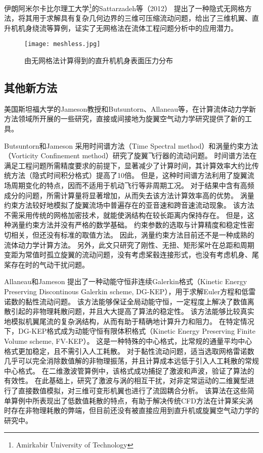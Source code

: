 \documentclass[doctor,openright,twoside,color]{buaathesis}
\begin{document}
伊朗阿米尔卡比尔理工大学\footnote{Amirkabir University of Technology}的Sattarzadeh等（2012）
提出了一种隐式无网格方法，将其用于求解具有复杂几何边界的三维可压缩流动问题，给出了三维机翼、直升机机身绕流等算例，证实了无网格法在流体工程问题分析中的应用潜力。
\begin{figure}[t!]
    \centering
    \texttt{[image: meshless.jpg]}
    \caption{由无网格法计算得到的直升机机身表面压力分布}
\end{figure}

\subsection{其他新方法}

美国斯坦福大学的Jameson教授和Butsuntorn、Allaneau等，在计算流体动力学新方法领域所开展的一些研究，直接或间接地为旋翼空气动力学研究提供了新的工具。

Butsuntorn和Jameson
采用时间谱方法（Time Spectral method）和涡量约束方法（Vorticity Confinement method）研究了旋翼飞行器的流动问题。
时间谱方法在满足工程问题所需精度要求的前提下，显著减少了计算时间，其计算效率大约比传统方法（隐式时间积分格式）提高了10倍。
但是，这种时间谱方法利用了旋翼流场周期变化的特点，因而不适用于机动飞行等非周期工况。
对于结果中含有高频成分的问题，所需计算量将显著增加，从而失去该方法计算效率高的优势。
涡量约束方法较好地模拟了旋翼流场中普遍存在的亚音速和跨音速流动现象。
该方法不需采用传统的网格加密技术，就能使涡结构在较长距离内保持存在。
但是，这种涡量约束方法并没有严格的数学基础。
约束参数的选取与计算精度和稳定性密切相关，但还没有标准的取值方法。
因此，涡量约束方法目前还不是一种成熟的流体动力学计算方法。
另外，此文只研究了刚性、无扭、矩形桨叶在总距和周期变距为常值时孤立旋翼的流动问题，没有考虑桨毂连接形式，也没有考虑机身、尾桨存在时的气动干扰问题。

Allaneau和Jameson
提出了一种动能守恒非连续Galerkin格式（Kinetic Energy Preserving Discontinous Galerkin scheme, DG-KEP），用于求解Euler方程和低雷诺数的黏性流动问题。
该方法能够保证全局动能守恒，一定程度上解决了数值离散引起的非物理耗散问题，并且大大提高了算法的稳定性。
该方法能够比较真实地模拟机翼尾流的复杂涡结构，从而有助于精确地计算升力和阻力。
在特定情况下，DG-KEP格式成为动能守恒有限体积格式（Kinetic Energy Preserving Finite Volume scheme, FV-KEP）。
这是一种特殊的中心格式，比常规的通量平均中心格式更加稳定，且不需引入人工耗散。
对于黏性流动问题，适当选取网格雷诺数几乎可以完全消除数值解的非物理振荡，并且计算成本远低于引入人工耗散的常规中心格式。
在二维激波管算例中，该格式成功捕捉了激波和声波，验证了算法的有效性。
在此基础上，研究了激波与涡的相互干扰，对非定常运动的二维翼型进行了直接数值模拟，对三维可变形机翼也进行了流固耦合分析。
该算法在这些简单算例中所表现出了低数值耗散的特点，有助于解决传统CFD方法在计算桨尖涡时存在非物理耗散的弊端，但目前还没有被直接应用到直升机或旋翼空气动力学的研究中。
\end{document}
